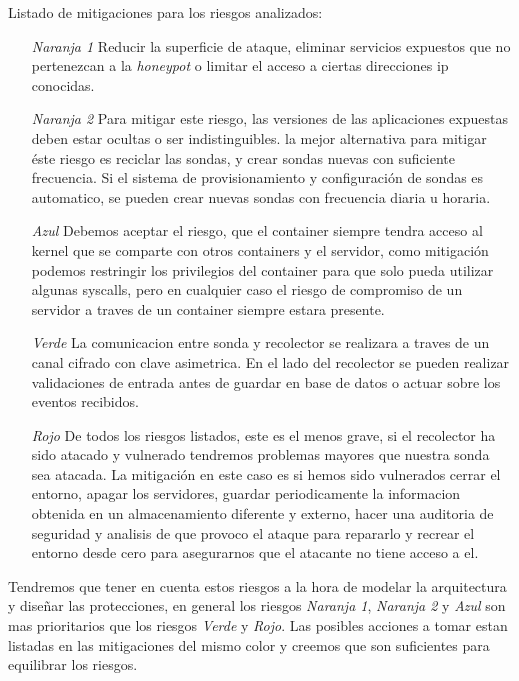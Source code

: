 Listado de mitigaciones para los riesgos analizados:
\begin{enumerate}
    \item[\emph{Naranja 1}] Reducir la superficie de ataque, eliminar servicios expuestos que no pertenezcan a la \emph{honeypot} o limitar el acceso a ciertas direcciones ip conocidas.
    \item[\emph{Naranja 2}] Para mitigar este riesgo, las versiones de las aplicaciones expuestas deben estar ocultas o ser indistinguibles. la mejor alternativa para mitigar éste riesgo es reciclar las sondas, y crear sondas nuevas con suficiente frecuencia. Si el sistema de provisionamiento y configuración de sondas es automatico, se pueden crear nuevas sondas con frecuencia diaria u horaria.
    \item[\emph{Azul}] Debemos aceptar el riesgo, que el container siempre tendra acceso al kernel que se comparte con otros containers y el servidor, como mitigación podemos restringir los privilegios del container para que solo pueda utilizar algunas syscalls, pero en cualquier caso el riesgo de compromiso de un servidor a traves de un container siempre estara presente. 
    \item[\emph{Verde}] La comunicacion entre sonda y recolector se realizara a traves de un canal cifrado con clave asimetrica. En el lado del recolector se pueden realizar validaciones de entrada antes de guardar en base de datos o actuar sobre los eventos recibidos.
    \item[\emph{Rojo}] De todos los riesgos listados, este es el menos grave, si el recolector ha sido atacado y vulnerado tendremos problemas mayores que nuestra sonda sea atacada. La mitigación en este caso es si hemos sido vulnerados cerrar el entorno, apagar los servidores, guardar periodicamente la informacion obtenida en un almacenamiento diferente y externo, hacer una auditoria de seguridad y analisis de que provoco el ataque para repararlo y recrear el entorno desde cero para asegurarnos que el atacante no tiene acceso a el.
\end{enumerate}

Tendremos que tener en cuenta estos riesgos a la hora de modelar la arquitectura y diseñar las protecciones, en general los riesgos \emph{Naranja 1}, \emph{Naranja 2} y \emph{Azul} son mas prioritarios que los riesgos \emph{Verde} y \emph{Rojo}. Las posibles acciones a tomar estan listadas en las mitigaciones del mismo color y creemos que son suficientes para equilibrar los riesgos.

